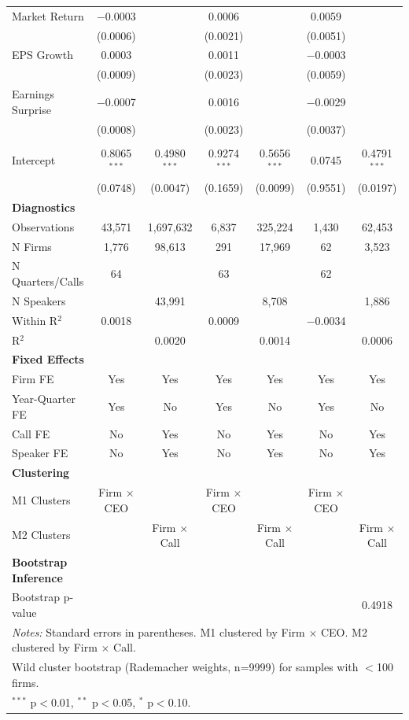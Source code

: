 \documentclass[11pt]{article}
\begin{document}
\begin{table}[htbp]
\begin{tabular}{lcccccc}
Market Return & $-$0.0003 &  & 0.0006 &  & 0.0059 &  \\
 & (0.0006) &  & (0.0021) &  & (0.0051) &  \\
EPS Growth & 0.0003 &  & 0.0011 &  & $-$0.0003 &  \\
 & (0.0009) &  & (0.0023) &  & (0.0059) &  \\
Earnings Surprise & $-$0.0007 &  & 0.0016 &  & $-$0.0029 &  \\
 & (0.0008) &  & (0.0023) &  & (0.0037) &  \\
 &  &  &  &  &  & \\
Intercept & 0.8065$^{***}$ & 0.4980$^{***}$ & 0.9274$^{***}$ & 0.5656$^{***}$ & 0.0745 & 0.4791$^{***}$ \\
 & (0.0748) & (0.0047) & (0.1659) & (0.0099) & (0.9551) & (0.0197) \\
\midrule
\textbf{Diagnostics} \\
Observations & 43,571 & 1,697,632 & 6,837 & 325,224 & 1,430 & 62,453 \\
N Firms & 1,776 & 98,613 & 291 & 17,969 & 62 & 3,523 \\
N Quarters/Calls & 64 &  & 63 &  & 62 &  \\
N Speakers &  & 43,991 &  & 8,708 &  & 1,886 \\
Within R$^2$ & 0.0018 &  & 0.0009 &  & $-$0.0034 &  \\
R$^2$ &  & 0.0020 &  & 0.0014 &  & 0.0006 \\
\midrule
\textbf{Fixed Effects} \\
Firm FE & Yes & Yes & Yes & Yes & Yes & Yes \\
Year-Quarter FE & Yes & No & Yes & No & Yes & No \\
Call FE & No & Yes & No & Yes & No & Yes \\
Speaker FE & No & Yes & No & Yes & No & Yes \\
\midrule
\textbf{Clustering} \\
M1 Clusters & Firm $\times$ CEO &  & Firm $\times$ CEO &  & Firm $\times$ CEO &  \\
M2 Clusters &  & Firm $\times$ Call &  & Firm $\times$ Call &  & Firm $\times$ Call \\
\midrule
\textbf{Bootstrap Inference} \\
Bootstrap p-value &  &  &  &  &  & 0.4918 \\
\bottomrule
\multicolumn{7}{l}{\parbox{\linewidth}{\footnotesize \textit{Notes:} Standard errors in parentheses. M1 clustered by Firm $\times$ CEO. M2 clustered by Firm $\times$ Call.}} \\
\multicolumn{7}{l}{\parbox{\linewidth}{\footnotesize Wild cluster bootstrap (Rademacher weights, n=9999) for samples with $<$100 firms.}} \\
\multicolumn{7}{l}{\parbox{\linewidth}{\footnotesize $^{***}$ p$<$0.01, $^{**}$ p$<$0.05, $^{*}$ p$<$0.10.}} \\
\end{tabular}
\end{table}
\end{document}
